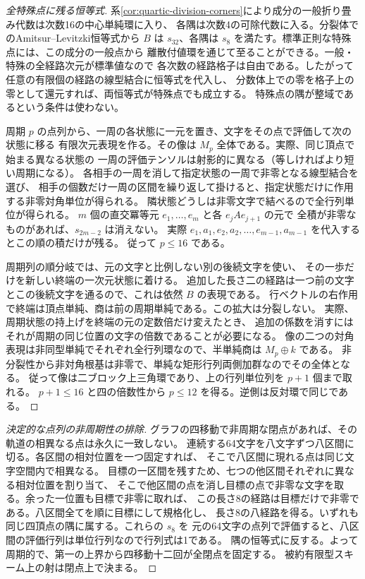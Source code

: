 \begin{proof}[全特殊点に残る恒等式]
系\ref{cor:quartic-division-corners}により成分の一般折り畳み代数は次数16の中心単純環に入り、
各隅は次数4の可除代数に入る。分裂体でのAmitsur--Levitzki恒等式から
$B$ は $s_{32}$、各隅は $s_8$ を満たす。標準正則な特殊点には、この成分の一般点から
離散付値環を通じて至ることができる。一般・特殊の全経路次元が標準値なので
各次数の経路格子は自由である。したがって任意の有限個の経路の線型結合に恒等式を代入し、
分数体上での零を格子上の零として還元すれば、両恒等式が特殊点でも成立する。
特殊点の隅が整域であるという条件は使わない。

周期 $p$ の点列から、一周の各状態に一元を置き、文字をその点で評価して次の状態に移る
有限次元表現を作る。その像は $M_p$ 全体である。実際、同じ頂点で始まる異なる状態の
一周の評価テンソルは射影的に異なる（等しければより短い周期になる）。
各相手の一周を消して指定状態の一周で非零となる線型結合を選び、
相手の個数だけ一周の区間を繰り返して掛けると、指定状態だけに作用する非零対角単位が得られる。
隣状態どうしは非零文字で結べるので全行列単位が得られる。
$m$ 個の直交冪等元 $e_1,\ldots,e_m$ と各 $e_jAe_{j+1}$ の元で
全積が非零なものがあれば、$s_{2m-2}$ は消えない。
実際 $e_1,a_1,e_2,a_2,\ldots,e_{m-1},a_{m-1}$ を代入するとこの順の積だけが残る。
従って $p\le16$ である。

周期列の順分岐では、元の文字と比例しない別の後続文字を使い、
その一歩だけを新しい終端の一次元状態に着ける。
追加した長さ二の経路は一つ前の文字とこの後続文字を通るので、これは依然 $B$ の表現である。
行ベクトルの右作用で終端は頂点単純、商は前の周期単純である。この拡大は分裂しない。
実際、周期状態の持上げを終端の元の定数倍だけ変えたとき、
追加の係数を消すにはそれが周期の同じ位置の文字の倍数であることが必要になる。
像の二つの対角表現は非同型単純でそれぞれ全行列環なので、半単純商は $M_p\oplus k$ である。
非分裂性から非対角根基は非零で、単純な矩形行列両側加群なのでその全体となる。
従って像は二ブロック上三角環であり、上の行列単位列を $p+1$ 個まで取れる。
$p+1\le16$ と四の倍数性から $p\le12$ を得る。逆側は反対環で同じである。
\end{proof}
\begin{proof}[決定的な点列の非周期性の排除]
グラフの四移動で非周期な閉点があれば、その軌道の相異なる点は永久に一致しない。
連続する64文字を八文字ずつ八区間に切る。各区間の相対位置を一つ固定すれば、
そこで八区間に現れる点は同じ文字空間内で相異なる。
目標の一区間を残すため、七つの他区間それぞれに異なる相対位置を割り当て、
そこで他区間の点を消し目標の点で非零な文字を取る。余った一位置も目標で非零に取れば、
この長さ8の経路は目標だけで非零である。八区間全てを順に目標にして規格化し、
長さ8の八経路を得る。いずれも同じ四頂点の隅に属する。これらの $s_8$ を
元の64文字の点列で評価すると、八区間の評価行列は単位行列なので行列式は1である。
隅の恒等式に反する。よって周期的で、第一の上界から四移動十二回が全閉点を固定する。
被約有限型スキーム上の射は閉点上で決まる。
\end{proof}
